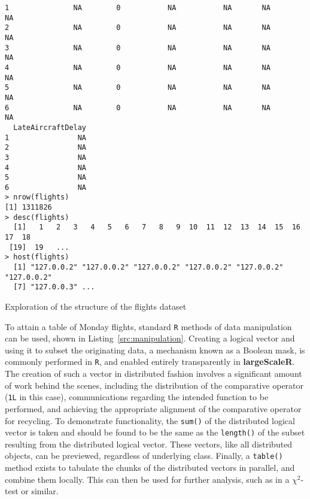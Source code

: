 \begin{listing}
\begin{verbatim}
1               NA        0           NA           NA       NA            NA
2               NA        0           NA           NA       NA            NA
3               NA        0           NA           NA       NA            NA
4               NA        0           NA           NA       NA            NA
5               NA        0           NA           NA       NA            NA
6               NA        0           NA           NA       NA            NA
  LateAircraftDelay
1                NA
2                NA
3                NA
4                NA
5                NA
6                NA
> nrow(flights)
[1] 1311826
> desc(flights)
  [1]   1   2   3   4   5   6   7   8   9  10  11  12  13  14  15  16  17  18
 [19]  19   ...
> host(flights)
  [1] "127.0.0.2" "127.0.0.2" "127.0.0.2" "127.0.0.2" "127.0.0.2" "127.0.0.2"
  [7] "127.0.0.3" ...
\end{verbatim}
\caption{Exploration of the structure of the flights dataset}\label{src:flights-structure}
\end{listing}

To attain a table of Monday flights, standard \texttt{R} methods of data manipulation can be used, shown in Listing~\ref{src:manipulation}.
Creating a logical vector and using it to subset the originating data, a mechanism known as a Boolean mask, is commonly performed in \texttt{R}, and enabled entirely transparently in \textbf{largeScaleR}.
The creation of such a vector in distributed fashion involves a significant amount of work behind the scenes, including the distribution of the comparative operator (\texttt{1L} in this case), communications regarding the intended function to be performed, and achieving the appropriate alignment of the comparative operator for recycling.
To demonstrate functionality, the \texttt{sum()} of the distributed logical vector is taken and should be found to be the same as the \texttt{length()} of the subset resulting from the distributed logical vector.
These vectors, like all distributed objects, can be previewed, regardless of underlying class.
Finally, a \texttt{table()} method exists to tabulate the chunks of the distributed vectors in parallel, and combine them locally.
This can then be used for further analysis, such as in a \(\chi^2\)-test or similar.

